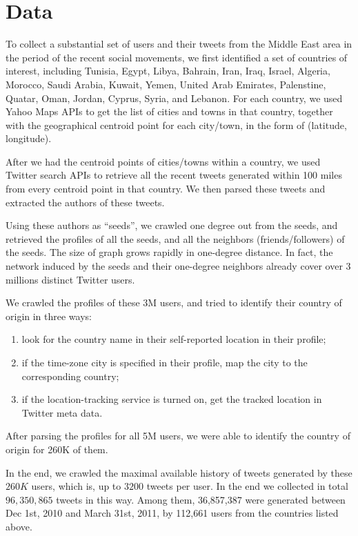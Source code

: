\documentclass[phd,tocprelim]{cornell}
\begin{document}
\section{Data}
To collect a substantial set of users and their tweets from the Middle East area in the period of the recent social movements, we first identified a set of countries of interest, including Tunisia, Egypt, Libya, Bahrain, Iran, Iraq, Israel, Algeria, Morocco, Saudi Arabia, Kuwait, Yemen, United Arab Emirates, Palenstine, Quatar, Oman, Jordan, Cyprus, Syria, and Lebanon. For each country, we used Yahoo Maps APIs to get the list of cities and towns in that country, together with the geographical centroid point for each city/town, in the form of (latitude, longitude).

After we had the centroid points of cities/towns within a country, we used Twitter search APIs to retrieve all the recent tweets generated within 100 miles from every centroid point in that country. We then parsed these tweets and extracted the authors of these tweets.

Using these authors as ``seeds'', we crawled one degree out from the seeds, and retrieved the profiles of all the seeds, and all the neighbors (friends/followers) of the seeds. The size of graph grows rapidly in one-degree distance. In fact, the network induced by the seeds and their one-degree neighbors already cover over 3 millions distinct Twitter users.

We crawled the profiles of these 3M users, and tried to identify their country of origin in three ways:
\begin{enumerate}
\item look for the country name in their self-reported location in their profile;
\item if the time-zone city is specified in their profile, map the city to the corresponding country;
\item if the location-tracking service is turned on, get the tracked location in Twitter meta data.
\end{enumerate}

After parsing the profiles for all 5M users, we were able to identify the country of origin for 260K of them.

In the end, we crawled the maximal available history of tweets generated by these $260K$ users, which is, up to $3200$ tweets per user. In the end we collected in total $96,350,865$ tweets in this way. Among them, 36,857,387 were generated between Dec 1st, 2010 and March 31st, 2011, by 112,661 users  from the countries listed above.
\end{document}

